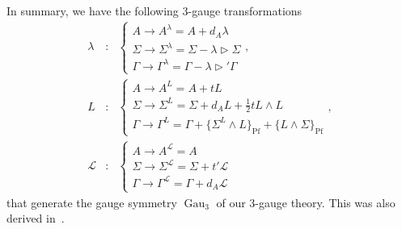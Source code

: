 \documentclass[onecolumn]{article}
\theoremstyle{theorem}
\theoremstyle{remark}
\theoremstyle{example}
\theoremstyle{definition}
\numberwithin{equation}{section}
\begin{document}
In summary, we have the following 3-gauge transformations
\begin{eqnarray}
     \lambda&:& \begin{cases}A\rightarrow A^\lambda=A+d_A\lambda \\ \Sigma\rightarrow \Sigma^\lambda=\Sigma - \lambda\rhd \Sigma \\ \Gamma \rightarrow \Gamma^\lambda=\Gamma- \lambda\rhd' \Gamma\end{cases},\nonumber \\
     L&:& \begin{cases}A\rightarrow A^L=A+tL \\ \Sigma\rightarrow \Sigma^L=\Sigma+d_AL + \frac{1}{2}tL\wedge L \\ \Gamma\rightarrow \Gamma^L =\Gamma + \{\Sigma^L\wedge L\}_\text{Pf}+\{L\wedge \Sigma\}_\text{Pf}\end{cases},\nonumber \\
     \mathcal{L}&:&\begin{cases} A\rightarrow A^\mathcal{L}=A \\ \Sigma\rightarrow \Sigma^\mathcal{L} =\Sigma+t'\mathcal{L} \\ \Gamma\rightarrow \Gamma^\mathcal{L} = \Gamma+ d_A\mathcal{L}\end{cases}\label{eq:3gautran}
\end{eqnarray}
that generate the gauge symmetry $\operatorname{Gau}_3$ of our 3-gauge theory. This was also derived in~\cite{Radenkovic:2019qme,Radenkovic:2021fqq}.
\end{document}
